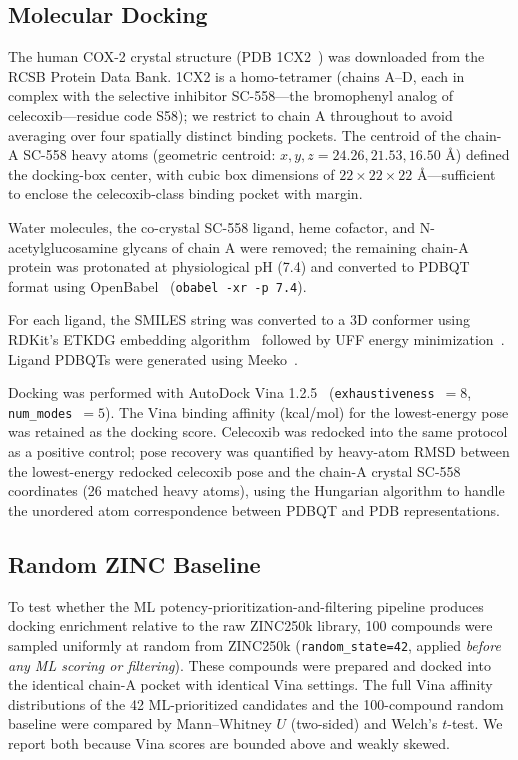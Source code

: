 \documentclass[11pt]{article}
\begin{document}
\subsection{Molecular Docking}

The human COX-2 crystal structure (PDB 1CX2~\cite{kurumbail1996}) was downloaded from the RCSB Protein Data Bank. 1CX2 is a homo-tetramer (chains A--D, each in complex with the selective inhibitor SC-558---the bromophenyl analog of celecoxib---residue code S58); we restrict to chain A throughout to avoid averaging over four spatially distinct binding pockets. The centroid of the chain-A SC-558 heavy atoms (geometric centroid: $x,y,z = 24.26, 21.53, 16.50$ \r{A}) defined the docking-box center, with cubic box dimensions of $22 \times 22 \times 22$ \r{A}---sufficient to enclose the celecoxib-class binding pocket with margin.

Water molecules, the co-crystal SC-558 ligand, heme cofactor, and N-acetylglucosamine glycans of chain A were removed; the remaining chain-A protein was protonated at physiological pH (7.4) and converted to PDBQT format using OpenBabel~\cite{oboyle2011} (\texttt{obabel -xr -p 7.4}).

For each ligand, the SMILES string was converted to a 3D conformer using RDKit's ETKDG embedding algorithm~\cite{riniker2015} followed by UFF energy minimization~\cite{rappe1992}. Ligand PDBQTs were generated using Meeko~\cite{meeko2024}.

Docking was performed with AutoDock Vina 1.2.5~\cite{trott2010, eberhardt2021} (\texttt{exhaustiveness}~$=8$, \texttt{num\_modes}~$=5$). The Vina binding affinity (kcal/mol) for the lowest-energy pose was retained as the docking score. Celecoxib was redocked into the same protocol as a positive control; pose recovery was quantified by heavy-atom RMSD between the lowest-energy redocked celecoxib pose and the chain-A crystal SC-558 coordinates (26 matched heavy atoms), using the Hungarian algorithm to handle the unordered atom correspondence between PDBQT and PDB representations.

\subsection{Random ZINC Baseline}

To test whether the ML potency-prioritization-and-filtering pipeline produces docking enrichment relative to the raw ZINC250k library, 100 compounds were sampled uniformly at random from ZINC250k (\texttt{random\_state=42}, applied \emph{before any ML scoring or filtering}). These compounds were prepared and docked into the identical chain-A pocket with identical Vina settings. The full Vina affinity distributions of the 42 ML-prioritized candidates and the 100-compound random baseline were compared by Mann--Whitney $U$ (two-sided) and Welch's $t$-test. We report both because Vina scores are bounded above and weakly skewed.
\end{document}
